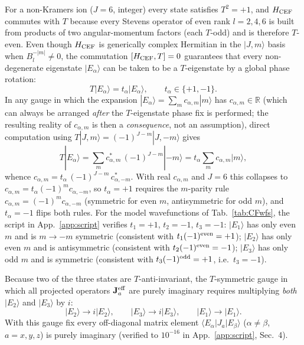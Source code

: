 \documentclass[reprint,amsmath,amssymb,aps,prb,longbibliography]{revtex4-2}
\newcommand{\fix}[1]{#1}
\newcommand{\Jeff}{\mathbf{J}^{\rm eff}}
\begin{document}
For a non-Kramers ion ($J=6$, integer) every state satisfies $T^2=+1$,
and $H_{\rm CEF}$ commutes with $T$ because every Stevens operator of
even rank $l=2,4,6$ is built from products of two angular-momentum
factors (each $T$-odd) and is therefore $T$-even. \fix{Even though
$H_{\rm CEF}$ is generically complex Hermitian in the $|J,m\rangle$
basis when $B_l^{-|m|}\neq 0$, the commutation $[H_{\rm CEF},T]=0$
guarantees that every non-degenerate eigenstate $|E_\alpha\rangle$ can
be taken to be a $T$-eigenstate by a global phase rotation:}
\begin{equation}
T|E_\alpha\rangle = t_\alpha|E_\alpha\rangle,\qquad t_\alpha\in\{+1,-1\}.
\label{eq:Teigvals}
\end{equation}
\fix{In any gauge in which the expansion $|E_\alpha\rangle =
\sum_m c_{\alpha,m}|m\rangle$ has $c_{\alpha,m}\in\mathbb R$ (which can
always be arranged \emph{after} the $T$-eigenstate phase fix is
performed; the resulting reality of $c_{\alpha,m}$ is then a
\emph{consequence}, not an assumption),} direct computation using
$T|J,m\rangle = (-1)^{J-m}|J,-m\rangle$ gives
\begin{equation}
T|E_\alpha\rangle = \sum_m c_{\alpha,m}^{*}\,(-1)^{J-m}|{-m}\rangle
= t_\alpha\sum_m c_{\alpha,m}|m\rangle,
\end{equation}
whence $c_{\alpha,m} = t_\alpha\,(-1)^{J-m}\,c_{\alpha,-m}^{*}$. With
real $c_{\alpha,m}$ and $J=6$ this collapses to
$c_{\alpha,m}=t_\alpha(-1)^{m}c_{\alpha,-m}$, so $t_\alpha = +1$ requires
the $m$-parity rule $c_{\alpha,m}=(-1)^m c_{\alpha,-m}$ (symmetric for
even $m$, antisymmetric for odd $m$), and $t_\alpha = -1$ flips both
rules.  For the model wavefunctions of Tab.~\ref{tab:CFwfs}, the script
in App.~\ref{app:script} verifies $t_1 = +1$, $t_2 = -1$, $t_3 = -1$:
$|E_1\rangle$ has only even $m$ and is $m\to -m$ symmetric (consistent
with $t_1 (-1)^{\rm even} = +1$); $|E_2\rangle$ has only even $m$ and is
antisymmetric (consistent with $t_2(-1)^{\rm even}=-1$); $|E_3\rangle$
has only odd $m$ and is symmetric (consistent with
$t_3 (-1)^{\rm odd} = +1$, i.e.\ $t_3 = -1$).

Because two of the three states are $T$-anti-invariant, the
$T$-symmetric gauge in which all projected operators $\Jeff_a$ are
purely imaginary requires multiplying \emph{both} $|E_2\rangle$ and
$|E_3\rangle$ by $i$:
\begin{equation}
|E_2\rangle\longrightarrow i|E_2\rangle,\qquad
|E_3\rangle\longrightarrow i|E_3\rangle,\qquad
|E_1\rangle\longrightarrow |E_1\rangle.
\label{eq:Tgauge}
\end{equation}
With this gauge fix every off-diagonal matrix element
$\langle E_\alpha|J_a|E_\beta\rangle$ ($\alpha\neq\beta$, $a=x,y,z$) is
purely imaginary (verified to $10^{-16}$ in App.~\ref{app:script}, Sec.~4).
\end{document}
